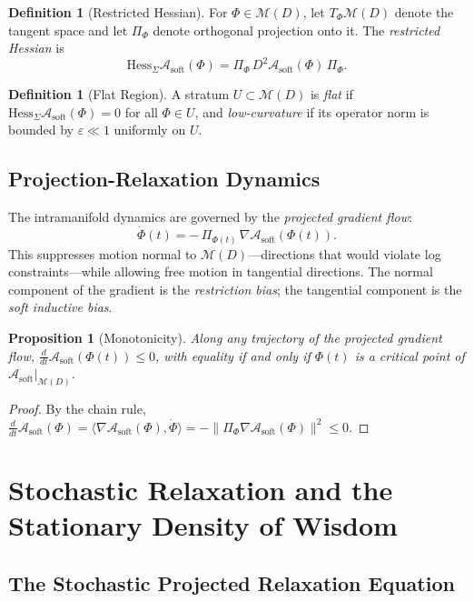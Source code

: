 \documentclass[12pt,oneside]{article}
\theoremstyle{plain}
\newtheorem{proposition}[theorem]{Proposition}
\theoremstyle{definition}
\newtheorem{definition}[theorem]{Definition}
\theoremstyle{remark}
\newcommand{\M}{\mathcal{M}}
\newcommand{\D}{D}
\newcommand{\Asoft}{\mathcal{A}_{\mathrm{soft}}}
\newcommand{\HessSig}{\mathrm{Hess}_{\Sigma}}
\begin{document}
\begin{definition}[Restricted Hessian]
For $\Phi \in \M(\D)$, let $T_\Phi\M(\D)$ denote the tangent space and let
$\Pi_\Phi$ denote orthogonal projection onto it. The \emph{restricted Hessian}
is
\[
  \HessSig\Asoft(\Phi) = \Pi_\Phi\,D^2\Asoft(\Phi)\,\Pi_\Phi.
\]
\end{definition}

\begin{definition}[Flat Region]
A stratum $U \subset \M(\D)$ is \emph{flat} if $\HessSig\Asoft(\Phi) = 0$ for
all $\Phi \in U$, and \emph{low-curvature} if its operator norm is bounded
by $\varepsilon \ll 1$ uniformly on $U$.
\end{definition}

\subsection{Projection-Relaxation Dynamics}

The intramanifold dynamics are governed by the \emph{projected gradient flow}:
\[
  \dot{\Phi}(t) = -\,\Pi_{\Phi(t)}\,\nabla\Asoft(\Phi(t)).
\]
This suppresses motion normal to $\M(\D)$---directions that would violate log
constraints---while allowing free motion in tangential directions. The normal
component of the gradient is the \emph{restriction bias}; the tangential
component is the \emph{soft inductive bias}.

\begin{proposition}[Monotonicity]
\label{prop:mono}
Along any trajectory of the projected gradient flow,
$\tfrac{d}{dt}\Asoft(\Phi(t)) \leq 0$, with equality if and only if $\Phi(t)$
is a critical point of $\Asoft|_{\M(\D)}$.
\end{proposition}

\begin{proof}
By the chain rule,
$\tfrac{d}{dt}\Asoft(\Phi) = \langle\nabla\Asoft(\Phi),\dot\Phi\rangle
= -\|\Pi_\Phi\nabla\Asoft(\Phi)\|^2 \leq 0$.
\end{proof}

\section{Stochastic Relaxation and the Stationary Density of Wisdom}
\label{sec:stochastic}

\subsection{The Stochastic Projected Relaxation Equation}
\end{document}
